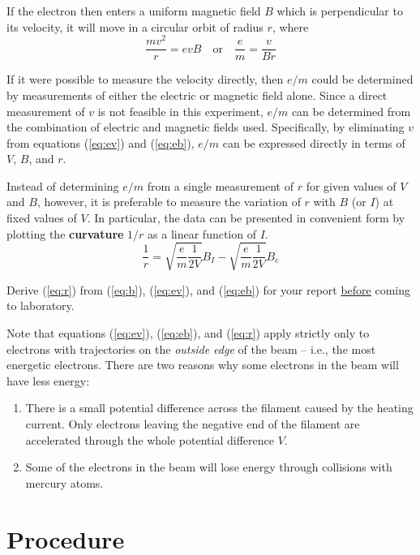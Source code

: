 If the electron then enters a uniform magnetic field $B$ which is perpendicular to its velocity, it will move in a circular orbit of radius $r$, where
\begin{equation}
  \frac{mv^2}{r}=evB\quad\mathrm{or}\quad \frac{e}{m}=\frac{v}{Br}
\label{eq:eb}
\end{equation}

If it were possible to measure the velocity directly, then $e/m$ could be determined by measurements of either the electric or magnetic field alone. Since a direct measurement of $v$ is not feasible in this experiment, $e/m$ can be determined from the combination of electric and magnetic fields used. Specifically, by eliminating $v$ from equations ({\ref{eq:ev}}) and ({\ref{eq:eb}}), $e/m$ can be expressed directly in terms of $V$, $B$, and $r$.\myskip

Instead of determining $e/m$ from a single measurement of $r$ for given values of $V$ and $B$, however, it is preferable to measure the variation of $r$ with $B$ (or $I$) at fixed values of $V$. In particular, the data can be presented in convenient form by plotting the \textbf{curvature} $1/r$ as a linear function of $I$.
\begin{equation}
  \frac{1}{r}=\sqrt{\frac{e}{m}\frac{1}{2V}}B_{I}-\sqrt{\frac{e}{m}\frac{1}{2V}}B_{e}
\label{eq:r}
\end{equation}

Derive ({\ref{eq:r}}) from ({\ref{eq:b}}), ({\ref{eq:ev}}), and ({\ref{eq:eb}}) for your report \underline{before} coming to laboratory.\myskip

Note that equations ({\ref{eq:ev}}), ({\ref{eq:eb}}), and ({\ref{eq:r}}) apply strictly only to electrons with trajectories on the \emph{outside edge} of the beam -- i.e., the most energetic electrons. There are two reasons why some electrons in the beam will have less energy:
\begin{enumerate}
\item There is a small potential difference across the filament caused by the heating current. Only electrons leaving the negative end of the filament are accelerated through the whole potential difference $V$.
\item Some of the electrons in the beam will lose energy through collisions with mercury atoms.
\end{enumerate}

\section{Procedure}
